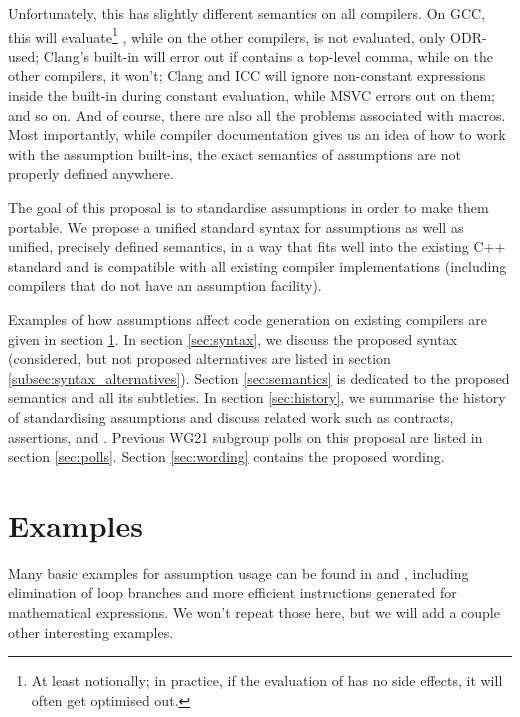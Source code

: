 Unfortunately, this has slightly different semantics on all compilers. On GCC, this will evaluate\footnote{At least notionally; in practice, if the evaluation of  has no side effects, it will often get optimised out.} , while on the other compilers,  is not evaluated, only ODR-used; Clang's built-in will error out if  contains a top-level comma, while on the other compilers, it won't; Clang and ICC will ignore non-constant expressions inside the built-in during constant evaluation, while MSVC errors out on them; and so on. And of course, there are also all the problems associated with macros. Most importantly, while compiler documentation gives us an idea of how to work with the assumption built-ins, the exact semantics of assumptions are not properly defined anywhere.

The goal of this proposal is to standardise assumptions in order to make them portable. We propose a unified standard syntax for assumptions as well as unified, precisely defined semantics, in a way that fits well into the existing C++ standard and is compatible with all existing compiler implementations (including compilers that do not have an assumption facility).

Examples of how assumptions affect code generation on existing compilers are given in section \ref{sec:examples}. In section \ref{sec:syntax}, we discuss the proposed syntax (considered, but not proposed alternatives are listed in section \ref{subsec:syntax_alternatives}). Section \ref{sec:semantics} is dedicated to the proposed semantics and all its subtleties. In section \ref{sec:history}, we summarise the history of standardising assumptions and discuss related work such as contracts, assertions, and . Previous WG21 subgroup polls on this proposal are listed in section \ref{sec:polls}. Section \ref{sec:wording} contains the proposed wording.


\section{Examples}
\label{sec:examples}

Many basic examples for assumption usage can be found in \cite{Regehr2014} and \cite{P2064R0}, including elimination of loop branches and more efficient instructions generated for mathematical expressions. We won't repeat those here, but we will add a couple other interesting examples.


